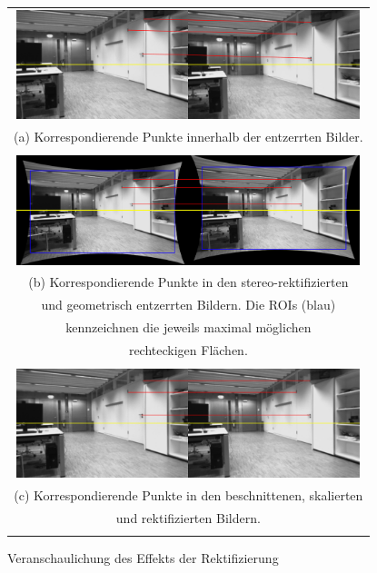 \begin{figure}[!h]
	\centering
	\begin{tabular}{c}
	\includegraphics[width=10cm]{img/calibration/undistort}\\
	\small (a) Korrespondierende Punkte innerhalb der entzerrten Bilder.\\\\
	\includegraphics[width=10cm]{img/calibration/rect_uncropped.pdf}\\
	\small (b) Korrespondierende Punkte in den stereo-rektifizierten\\ und geometrisch entzerrten Bildern. Die ROIs (blau)\\ kennzeichnen die jeweils maximal möglichen\\ rechteckigen Flächen.\\\\
	\includegraphics[width=10cm]{img/calibration/rect_cropped.pdf}\\
	\small (c) Korrespondierende Punkte in den beschnittenen, skalierten\\ und rektifizierten Bildern. \\\\
	\end{tabular}
\caption{Veranschaulichung des Effekts der Rektifizierung}
\label{fig:rectification}
\end{figure}

